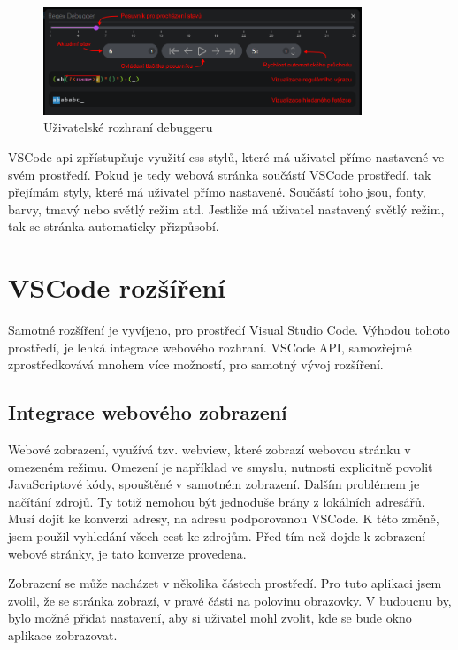 \begin{figure}[!h]
	\centering
	\includegraphics[width=0.85\textwidth]{Figures/appDebugger.png}
	\caption{Uživatelské rozhraní debuggeru}
	\label{fig:DebuggerUI}
\end{figure}

VSCode api zpřístupňuje využití css stylů, které má uživatel přímo nastavené ve svém prostředí.
Pokud je tedy webová stránka součástí VSCode prostředí, tak přejímám styly, které má uživatel přímo nastavené.
Součástí toho jsou, fonty, barvy, tmavý nebo světlý režim atd.
Jestliže má uživatel nastavený světlý režim, tak se stránka automaticky přizpůsobí.

\section{VSCode rozšíření}

Samotné rozšíření je vyvíjeno, pro prostředí Visual Studio Code.
Výhodou tohoto prostředí, je lehká integrace webového rozhraní.
VSCode API, samozřejmě zprostředkovává mnohem více možností, pro samotný vývoj rozšíření.

\subsection*{Integrace webového zobrazení}

Webové zobrazení, využívá tzv. webview, které zobrazí webovou stránku v omezeném režimu.
Omezení je například ve smyslu, nutnosti explicitně povolit JavaScriptové kódy, spouštěné v samotném zobrazení.
Dalším problémem je načítání zdrojů.
Ty totiž nemohou být jednoduše brány z lokálních adresářů. 
Musí dojít ke konverzi adresy, na adresu podporovanou VSCode. 
K této změně, jsem použil vyhledání všech cest ke zdrojům.
Před tím než dojde k zobrazení webové stránky, je tato konverze provedena.

Zobrazení se může nacházet v několika částech prostředí.
Pro tuto aplikaci jsem zvolil, že se stránka zobrazí, v pravé části na polovinu obrazovky.
V budoucnu by, bylo možné přidat nastavení, aby si uživatel mohl zvolit, kde se bude okno aplikace zobrazovat.

